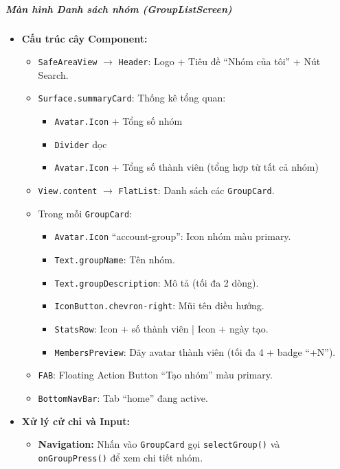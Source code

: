 \subparagraph{Màn hình Danh sách nhóm (GroupListScreen)}
\begin{itemize}
    \item \textbf{Cấu trúc cây Component:}
        \begin{itemize}
            \item \texttt{SafeAreaView} $\rightarrow$ \texttt{Header}: Logo + Tiêu đề ``Nhóm của tôi'' + Nút Search.
            \item \texttt{Surface.summaryCard}: Thống kê tổng quan:
                \begin{itemize}
                    \item \texttt{Avatar.Icon} + Tổng số nhóm
                    \item \texttt{Divider} dọc
                    \item \texttt{Avatar.Icon} + Tổng số thành viên (tổng hợp từ tất cả nhóm)
                \end{itemize}
            \item \texttt{View.content} $\rightarrow$ \texttt{FlatList}: Danh sách các \texttt{GroupCard}.
            \item Trong mỗi \texttt{GroupCard}:
                \begin{itemize}
                    \item \texttt{Avatar.Icon} ``account-group'': Icon nhóm màu primary.
                    \item \texttt{Text.groupName}: Tên nhóm.
                    \item \texttt{Text.groupDescription}: Mô tả (tối đa 2 dòng).
                    \item \texttt{IconButton.chevron-right}: Mũi tên điều hướng.
                    \item \texttt{StatsRow}: Icon + số thành viên | Icon + ngày tạo.
                    \item \texttt{MembersPreview}: Dãy avatar thành viên (tối đa 4 + badge ``+N'').
                \end{itemize}
            \item \texttt{FAB}: Floating Action Button ``Tạo nhóm'' màu primary.
            \item \texttt{BottomNavBar}: Tab ``home'' đang active.
        \end{itemize}
    \item \textbf{Xử lý cử chỉ và Input:}
        \begin{itemize}
            \item \textbf{Navigation:} Nhấn vào \texttt{GroupCard} gọi \texttt{selectGroup()} và \texttt{onGroupPress()} để xem chi tiết nhóm.

\end{itemize}
\end{itemize}
